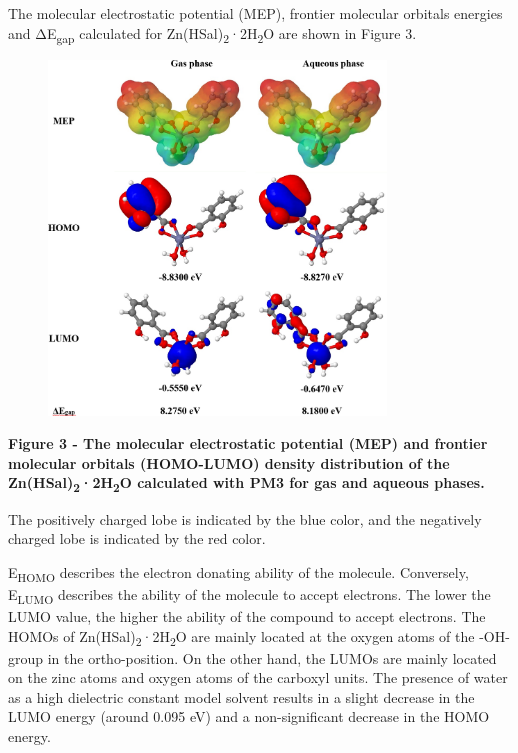 The molecular electrostatic potential (MEP), frontier molecular orbitals
energies and ΔE\textsubscript{gap} calculated for
Zn(HSal)\textsubscript{2}·2H\textsubscript{2}O are shown in Figure 3.

\begin{figure}[H]
	\centering
	\includegraphics[width=0.8\textwidth]{assets/41}
	\caption*{}
\end{figure}

{\bfseries Figure 3 - The molecular electrostatic potential (MEP) and
frontier molecular orbitals (HOMO-LUMO) density distribution of the
Zn(HSal)\textsubscript{2}·2H\textsubscript{2}O calculated with PM3 for
gas and aqueous phases.}

The positively charged lobe is indicated by the blue color, and the
negatively charged lobe is indicated by the red color.

E\textsubscript{HOMO} describes the electron donating ability of the
molecule. Conversely, E\textsubscript{LUMO} describes the ability of the
molecule to accept electrons. The lower the LUMO value, the higher the
ability of the compound to accept electrons. The HOMOs of
Zn(HSal)\textsubscript{2}·2H\textsubscript{2}O are mainly located at the
oxygen atoms of the -OH-group in the ortho-position. On the other hand,
the LUMOs are mainly located on the zinc atoms and oxygen atoms of the
carboxyl units. The presence of water as a high dielectric constant
model solvent results in a slight decrease in the LUMO energy (around
0.095 eV) and a non-significant decrease in the HOMO energy.

